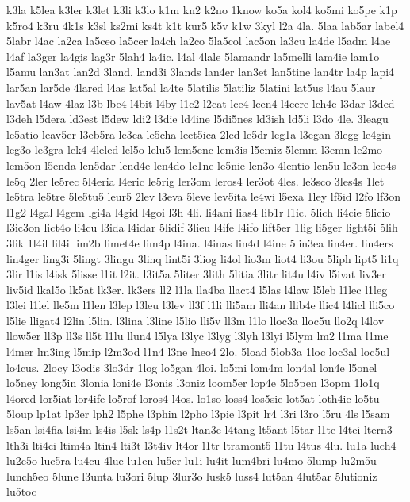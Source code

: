 {k3la
k5lea
k3ler
k3let
k3li
k3lo
k1m
kn2
k2no
1know
ko5a
kol4
ko5mi
ko5pe
k1p
k5ro4
k3ru
4k1s
k3sl
ks2mi
ks4t
k1t
kur5
k5v
k1w
3kyl
l2a
4la.
5laa
lab5ar
label4
5labr
l4ac
la2ca
la5ceo
la5cer
la4ch
la2co
5la5col
lac5on
la3cu
la4de
l5adm
l4ae
l4af
la3ger
la4gis
lag3r
5lah4
la4ic.
l4al
4lale
5lamandr
la5melli
lam4ie
lam1o
l5amu
lan3at
lan2d
3land.
land3i
3lands
lan4er
lan3et
lan5tine
lan4tr
la4p
lapi4
lar5an
lar5de
4lared
l4as
lat5al
la4te
5latilis
5latiliz
5latini
lat5us
l4au
5laur
lav5at
l4aw
4laz
l3b
lbe4
l4bit
l4by
l1c2
l2cat
lce4
lcen4
l4cere
lch4e
l3dar
l3ded
l3deh
l5dera
ld3est
l5dew
ldi2
l3die
ld4ine
l5di5nes
ld3ish
ld5li
l3do
4le.
3leagu
le5atio
leav5er
l3eb5ra
le3ca
le5cha
lect5ica
2led
le5dr
leg1a
l3egan
3legg
le4gin
leg3o
le3gra
lek4
4leled
lel5o
lelu5
lem5enc
lem3is
l5emiz
5lemm
l3emn
le2mo
lem5on
l5enda
len5dar
lend4e
len4do
le1ne
le5nie
len3o
4lentio
len5u
le3on
leo4s
le5q
2ler
le5rec
5l4eria
l4eric
le5rig
ler3om
leros4
ler3ot
4les.
le3sco
3les4s
1let
le5tra
le5tre
5le5tu5
leur5
2lev
l3eva
5leve
lev5ita
le4wi
l5exa
1ley
lf5id
l2fo
lf3on
l1g2
l4gal
l4gem
lgi4a
l4gid
l4goi
l3h
4li.
li4ani
lias4
lib1r
l1ic.
5lich
li4cie
5licio
l3ic3on
lict4o
li4cu
l3ida
l4idar
5lidif
3lieu
l4ife
l4ifo
lift5er
1lig
li5ger
light5i
5lih
3lik
1l4il
lil4i
lim2b
limet4e
lim4p
l4ina.
l4inas
lin4d
l4ine
5lin3ea
lin4er.
lin4ers
lin4ger
ling3i
5lingt
3lingu
3linq
lint5i
3liog
li4ol
lio3m
liot4
li3ou
5liph
lipt5
li1q
3lir
l1is
l4isk
5lisse
l1it
l2it.
l3it5a
5liter
3lith
5litia
3litr
lit4u
l4iv
l5ivat
liv3er
liv5id
lkal5o
lk5at
lk3er.
lk3ers
ll2
l1la
lla4ba
llact4
l5las
l4law
l5leb
l1lec
l1leg
l3lei
l1lel
lle5m
l1len
l3lep
l3leu
l3lev
ll3f
l1li
lli5am
lli4an
llib4e
llic4
l4licl
lli5co
l5lie
lligat4
l2lin
l5lin.
l3lina
l3line
l5lio
lli5v
ll3m
l1lo
lloc3a
lloc5u
llo2q
l4lov
llow5er
ll3p
ll3s
ll5t
l1lu
llun4
l5lya
l3lyc
l3lyg
l3lyh
l3lyi
l5lym
lm2
l1ma
l1me
l4mer
lm3ing
l5mip
l2m3od
l1n4
l3ne
lneo4
2lo.
5load
5lob3a
1loc
loc3al
loc5ul
lo4cus.
2locy
l3odis
3lo3dr
1log
lo5gan
4loi.
lo5mi
lom4m
lon4al
lon4e
l5onel
lo5ney
long5in
3lonia
loni4e
l3onis
l3oniz
loom5er
lop4e
5lo5pen
l3opm
1lo1q
l4ored
lor5iat
lor4ife
lo5rof
loros4
l4os.
lo1so
loss4
los5sie
lot5at
loth4ie
lo5tu
5loup
lp1at
lp3er
lph2
l5phe
l3phin
l2pho
l3pie
l3pit
lr4
l3ri
l3ro
l5ru
4ls
l5sam
ls5an
lsi4fia
lsi4m
ls4is
l5sk
ls4p
l1s2t
ltan3e
l4tang
lt5ant
l5tar
l1te
l4tei
ltern3
lth3i
lti4ci
ltim4a
ltin4
lti3t
l3t4iv
lt4or
l1tr
ltramont5
l1tu
l4tus
4lu.
lu1a
luch4
lu2c5o
luc5ra
lu4cu
4lue
lu1en
lu5er
lu1i
lu4it
lum4bri
lu4mo
5lump
lu2m5u
lunch5eo
5lune
l3unta
lu3ori
5lup
3lur3o
lusk5
luss4
lut5an
4lut5ar
5lutioniz
lu5toc
}
